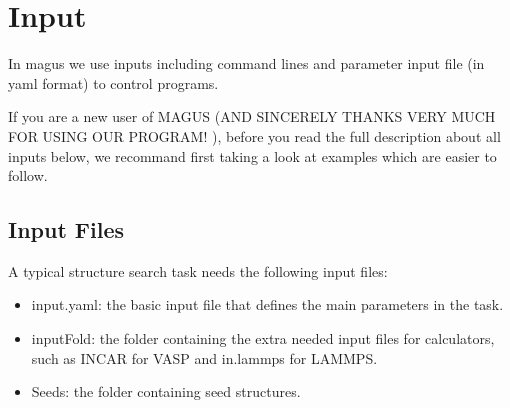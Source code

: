 \documentclass[12pt,oneside]{book}
\begin{document}
\chapter{Input}
In magus we use inputs including command lines and parameter input file (in yaml format) to control programs. 

If you are a new user of MAGUS (AND SINCERELY THANKS VERY MUCH FOR USING OUR PROGRAM! ), before you read the full description about all inputs below, we recommand first taking a look at examples which are easier to follow. 

\section{Input Files}
A typical structure search task needs the following input files:
\begin{itemize}
    \item input.yaml: the basic input file that defines the main parameters in the task.
    \item inputFold: the folder containing the extra needed input files for calculators, such as INCAR for VASP and in.lammps for LAMMPS.
    \item Seeds: the folder containing seed structures.
\end{itemize}
\end{document}
